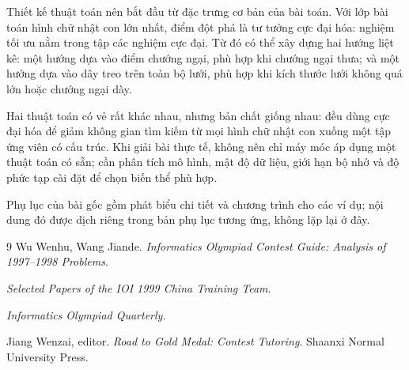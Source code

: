 \documentclass[11pt]{article}
\begin{document}
Thiết kế thuật toán nên bắt đầu từ đặc trưng cơ bản của bài toán. Với lớp bài
toán hình chữ nhật con lớn nhất, điểm đột phá là tư tưởng cực đại hóa: nghiệm
tối ưu nằm trong tập các nghiệm cực đại. Từ đó có thể xây dựng hai hướng
liệt kê: một hướng dựa vào điểm chướng ngại, phù hợp khi chướng ngại thưa; và
một hướng dựa vào dây treo trên toàn bộ lưới, phù hợp khi kích thước lưới
không quá lớn hoặc chướng ngại dày.

Hai thuật toán có vẻ rất khác nhau, nhưng bản chất giống nhau: đều dùng cực
đại hóa để giảm không gian tìm kiếm từ mọi hình chữ nhật con xuống một tập
ứng viên có cấu trúc. Khi giải bài thực tế, không nên chỉ máy móc áp dụng một
thuật toán có sẵn; cần phân tích mô hình, mật độ dữ liệu, giới hạn bộ nhớ và
độ phức tạp cài đặt để chọn biến thể phù hợp.

Phụ lục của bài gốc gồm phát biểu chi tiết và chương trình cho các ví dụ; nội
dung đó được dịch riêng trong bản phụ lục tương ứng, không lặp lại ở đây.

\begin{thebibliography}{9}
Wu Wenhu, Wang Jiande.
\textit{Informatics Olympiad Contest Guide: Analysis of 1997--1998 Problems}.

\textit{Selected Papers of the IOI 1999 China Training Team}.

\textit{Informatics Olympiad Quarterly}.

Jiang Wenzai, editor.
\textit{Road to Gold Medal: Contest Tutoring}.
Shaanxi Normal University Press.
\end{thebibliography}
\end{document}
